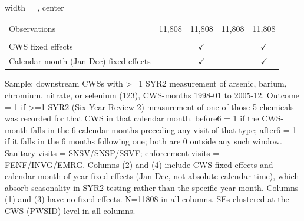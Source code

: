 \begin{table}[htbp]
\begin{adjustbox}{width = \textwidth, center}
\begin{tabular}{lcccc}
          \\
         
         Observations                           & 11,808         & 11,808         & 11,808         & 11,808\\  
         
          \\
         
         CWS fixed effects                      &                & $\checkmark$   &                & $\checkmark$\\   
         Calendar month (Jan-Dec) fixed effects &                & $\checkmark$   &                & $\checkmark$\\   
         
         \bottomrule
         
      \end{tabular}
      
      
      
   \end{adjustbox}
      {\tiny\linespread{1}\selectfont \par \raggedright 
   Sample: downstream CWSs with >=1 SYR2 measurement of arsenic, barium, chromium, nitrate, or selenium (123), CWS-months 1998-01 to 2005-12. Outcome = 1 if >=1 SYR2 (Six-Year Review 2) measurement of one of those 5 chemicals was recorded for that CWS in that calendar month. before6 = 1 if the CWS-month falls in the 6 calendar months preceding any visit of that type; after6 = 1 if it falls in the 6 months following one; both are 0 outside any such window. Sanitary visits = SNSV/SNSP/SSVF; enforcement visits = FENF/INVG/EMRG. Columns (2) and (4) include CWS fixed effects and calendar-month-of-year fixed effects (Jan-Dec, not absolute calendar time), which absorb seasonality in SYR2 testing rather than the specific year-month. Columns (1) and (3) have no fixed effects. N=11808 in all columns. SEs clustered at the CWS (PWSID) level in all columns.}
   
\end{table}


